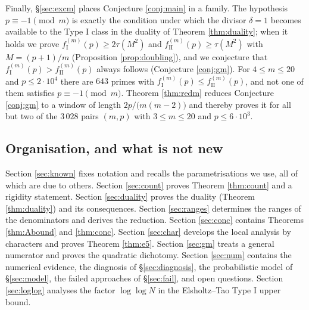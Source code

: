 \documentclass[11pt,reqno]{amsart}
\theoremstyle{plain}
\theoremstyle{definition}
\numberwithin{equation}{section}
\newcommand{\fI}{f_{\mathrm{I}}}
\newcommand{\fII}{f_{\mathrm{II}}}
\begin{document}
Finally, \S\ref{sec:excm} places Conjecture \ref{conj:main} in a family. The
hypothesis $p\equiv-1\pmod m$ is exactly the condition under which the divisor
$\delta=1$ becomes available to the Type I class in the duality of Theorem
\ref{thm:duality}; when it holds we prove $\fI^{(m)}(p)\ge2\tau(M^{2})$ and
$\fII^{(m)}(p)\ge\tau(M^{2})$ with $M=(p+1)/m$ (Proposition \ref{prop:doubling}), and
we conjecture that $\fI^{(m)}(p)>\fII^{(m)}(p)$ always follows (Conjecture
\ref{conj:gm}). For $4\le m\le20$ and $p\le2\cdot10^{4}$ there are $643$ primes with
$\fI^{(m)}(p)\le\fII^{(m)}(p)$, and not one of them satisfies $p\equiv-1\pmod m$.
Theorem \ref{thm:redm} reduces Conjecture \ref{conj:gm} to a window of length
$2p/\bigl(m(m-2)\bigr)$ and thereby proves it for all but two of the $3\,028$ pairs
$(m,p)$ with $3\le m\le20$ and $p\le6\cdot10^{3}$.

\subsection{Organisation, and what is not new}
Section \ref{sec:known} fixes notation and recalls the parametrisations we use, all
of which are due to others. Section \ref{sec:count} proves Theorem \ref{thm:count}
and a rigidity statement. Section \ref{sec:duality} proves the duality
(Theorem \ref{thm:duality}) and its consequences. Section \ref{sec:ranges} determines the ranges of the
denominators and derives the reduction. Section \ref{sec:conc} contains
Theorems \ref{thm:Abound} and \ref{thm:conc}. Section \ref{sec:char} develops the
local analysis by characters and proves Theorem \ref{thm:e5}. Section \ref{sec:gm}
treats a general numerator and proves the quadratic dichotomy. Section \ref{sec:num}
contains the numerical evidence, the diagnosis of \S\ref{sec:diagnosis}, the
probabilistic model of \S\ref{sec:model}, the failed approaches of \S\ref{sec:fail},
and open questions. Section \ref{sec:loglog} analyses the factor $\log\log N$ in the
Elsholtz--Tao Type I upper bound.
\end{document}
